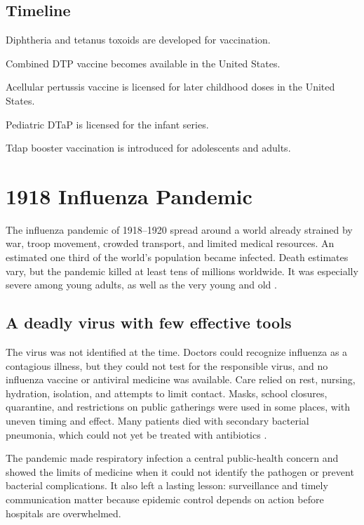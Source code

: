 \documentclass[12pt,oneside]{book}
\begin{document}
\section*{Timeline}
\begin{description}[leftmargin=2.3cm,style=nextline]
  \item[1920s] Diphtheria and tetanus toxoids are developed for vaccination.
  \item[1948] Combined DTP vaccine becomes available in the United States.
  \item[1991] Acellular pertussis vaccine is licensed for later childhood doses in the United States.
  \item[1996] Pediatric DTaP is licensed for the infant series.
  \item[2000s] Tdap booster vaccination is introduced for adolescents and adults.
\end{description}
\chapter[1918 Influenza Pandemic]{1918 Influenza Pandemic}

The influenza pandemic of 1918--1920 spread around a world already strained
by war, troop movement, crowded transport, and limited medical resources. An
estimated one third of the world's population became infected. Death estimates
vary, but the pandemic killed at least tens of millions worldwide. It was
especially severe among young adults, as well as the very young and old
\cite{cdc1918Influenza}.

\section{A deadly virus with few effective tools}
The virus was not identified at the time. Doctors could recognize influenza
as a contagious illness, but they could not test for the responsible virus,
and no influenza vaccine or antiviral medicine was available. Care relied on
rest, nursing, hydration, isolation, and attempts to limit contact. Masks,
school closures, quarantine, and restrictions on public gatherings were used
in some places, with uneven timing and effect. Many patients died with
secondary bacterial pneumonia, which could not yet be treated with antibiotics
\cite{cdc1918Influenza}.

The pandemic made respiratory infection a central public-health concern and
showed the limits of medicine when it could not identify the pathogen or
prevent bacterial complications. It also left a lasting lesson: surveillance
and timely communication matter because epidemic control depends on action
before hospitals are overwhelmed.
\end{document}
